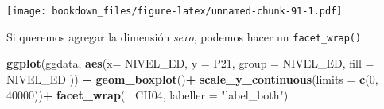 \documentclass[]{book}
\newenvironment{Shaded}{\begin{snugshade}}{\end{snugshade}}
\newcommand{\CommentTok}[1]{\textcolor[rgb]{0.56,0.35,0.01}{\textit{#1}}}
\newcommand{\DataTypeTok}[1]{\textcolor[rgb]{0.13,0.29,0.53}{#1}}
\newcommand{\DecValTok}[1]{\textcolor[rgb]{0.00,0.00,0.81}{#1}}
\newcommand{\KeywordTok}[1]{\textcolor[rgb]{0.13,0.29,0.53}{\textbf{#1}}}
\newcommand{\NormalTok}[1]{#1}
\newcommand{\OperatorTok}[1]{\textcolor[rgb]{0.81,0.36,0.00}{\textbf{#1}}}
\newcommand{\StringTok}[1]{\textcolor[rgb]{0.31,0.60,0.02}{#1}}
\begin{document}
\begin{Shaded}
\end{Shaded}

\begin{Shaded}
\end{Shaded}

\texttt{[image: bookdown\_files/figure-latex/unnamed-chunk-91-1.pdf]}

Si queremos agregar la dimensión \emph{sexo}, podemos hacer un \texttt{facet\_wrap()}

\begin{Shaded}
\begin{Highlighting}[]
\KeywordTok{ggplot}\NormalTok{(ggdata, }\KeywordTok{aes}\NormalTok{(}\DataTypeTok{x=}\NormalTok{ NIVEL_ED, }\DataTypeTok{y =}\NormalTok{ P21, }\DataTypeTok{group =}\NormalTok{ NIVEL_ED, }\DataTypeTok{fill =}\NormalTok{ NIVEL_ED )) }\OperatorTok{+}
\StringTok{  }\KeywordTok{geom_boxplot}\NormalTok{()}\OperatorTok{+}
\StringTok{  }\KeywordTok{scale_y_continuous}\NormalTok{(}\DataTypeTok{limits =} \KeywordTok{c}\NormalTok{(}\DecValTok{0}\NormalTok{, }\DecValTok{40000}\NormalTok{))}\OperatorTok{+}
\StringTok{  }\KeywordTok{facet_wrap}\NormalTok{(}\OperatorTok{~}\StringTok{ }\NormalTok{CH04, }\DataTypeTok{labeller =} \StringTok{"label_both"}\NormalTok{)}
\end{Highlighting}
\end{Shaded}
\end{document}
